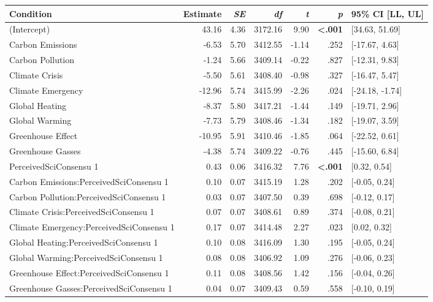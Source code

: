 \begin{table}[ht]
\centering
\begin{tabular}{lrrrrrl}
  \hline
Condition & Estimate & \textit{SE} & \textit{df} & \textit{t} & \textit{p} & 95\% CI [LL, UL] \\ 
  \hline
(Intercept) & 43.16 & 4.36 & 3172.16 & 9.90 & \textbf{\textless  .001} & [34.63, 51.69] \\ 
  Carbon Emissions & -6.53 & 5.70 & 3412.55 & -1.14 & .252 & [-17.67, 4.63] \\ 
  Carbon Pollution & -1.24 & 5.66 & 3409.14 & -0.22 & .827 & [-12.31, 9.83] \\ 
  Climate Crisis & -5.50 & 5.61 & 3408.40 & -0.98 & .327 & [-16.47, 5.47] \\ 
  Climate Emergency & -12.96 & 5.74 & 3415.99 & -2.26 & .024 & [-24.18, -1.74] \\ 
  Global Heating & -8.37 & 5.80 & 3417.21 & -1.44 & .149 & [-19.71, 2.96] \\ 
  Global Warming & -7.73 & 5.79 & 3408.46 & -1.34 & .182 & [-19.07, 3.59] \\ 
  Greenhouse Effect & -10.95 & 5.91 & 3410.46 & -1.85 & .064 & [-22.52, 0.61] \\ 
  Greenhouse Gasses & -4.38 & 5.74 & 3409.22 & -0.76 & .445 & [-15.60, 6.84] \\ 
  PerceivedSciConsensu 1 & 0.43 & 0.06 & 3416.32 & 7.76 & \textbf{\textless  .001} & [0.32, 0.54] \\ 
  Carbon Emissions:PerceivedSciConsensu 1 & 0.10 & 0.07 & 3415.19 & 1.28 & .202 & [-0.05, 0.24] \\ 
  Carbon Pollution:PerceivedSciConsensu 1 & 0.03 & 0.07 & 3407.50 & 0.39 & .698 & [-0.12, 0.17] \\ 
  Climate Crisis:PerceivedSciConsensu 1 & 0.07 & 0.07 & 3408.61 & 0.89 & .374 & [-0.08, 0.21] \\ 
  Climate Emergency:PerceivedSciConsensu 1 & 0.17 & 0.07 & 3414.48 & 2.27 & .023 & [0.02, 0.32] \\ 
  Global Heating:PerceivedSciConsensu 1 & 0.10 & 0.08 & 3416.09 & 1.30 & .195 & [-0.05, 0.24] \\ 
  Global Warming:PerceivedSciConsensu 1 & 0.08 & 0.08 & 3406.92 & 1.09 & .276 & [-0.06, 0.23] \\ 
  Greenhouse Effect:PerceivedSciConsensu 1 & 0.11 & 0.08 & 3408.56 & 1.42 & .156 & [-0.04, 0.26] \\ 
  Greenhouse Gasses:PerceivedSciConsensu 1 & 0.04 & 0.07 & 3409.43 & 0.59 & .558 & [-0.10, 0.19] \\ 
   \hline
\end{tabular}
\end{table}
